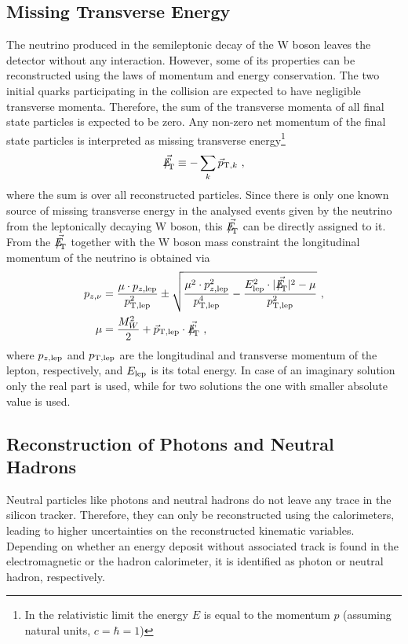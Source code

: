 \subsection{Missing Transverse Energy}
The neutrino produced in the semileptonic decay of the W boson leaves the detector without any interaction. However, some of its properties can be reconstructed using the laws of momentum and energy conservation. The two initial quarks participating in the collision are expected to have negligible transverse momenta. Therefore, the sum of the transverse momenta of all final state particles is expected to be zero. Any non-zero net momentum of the final state particles is interpreted as missing transverse energy\footnote{In the relativistic limit the energy $E$ is equal to the momentum $p$ (assuming natural units, $c=\hbar=1$)}\cite{MET}
\begin{equation}
\vec{{E\!\!\!\!/}_{\!\mathrm{T}}} \equiv -\sum_k \vec{p}_{{\rm T},k} ~,
\end{equation}
where the sum is over all reconstructed particles. Since there is only one known source of missing transverse energy in the analysed events given by the neutrino from the leptonically decaying W boson, this $\vec{{E\!\!\!\!/}_{\!\mathrm{T}}}$ can be directly assigned to it. From the $\vec{{E\!\!\!\!/}_{\!\mathrm{T}}}$ together with the W boson mass constraint the longitudinal momentum of the neutrino is obtained \cite{PAS} via
\begin{align}
p_{z,\nu} &= \frac{\mu \cdot p_{z,{\rm lep}}}{p_{\rm T,lep}^2} \pm \sqrt{\frac{\mu^2 \cdot p_{z,{\rm lep}}^2}{p_{\rm T,lep}^4} - \frac{E_{\rm lep}^2 \cdot |\vec{\MET}|^2 - \mu}{p_{\rm T,lep}^2}} ~, \\
\mu &= \frac{M_W^2}{2} + \vec{p}_{\rm T,lep}\cdot \vec{\MET} ~,
\end{align} 
where $p_{z,{\rm lep}}$ and $p_{\rm T,lep}$ are the longitudinal  and transverse momentum of the lepton, respectively, and $E_{\rm lep}$ is its total energy. In case of an imaginary solution only the real part is used, while for two solutions the one with smaller absolute value is used.
\subsection{Reconstruction of Photons and Neutral Hadrons}
Neutral particles like photons and neutral hadrons do not leave any trace in the silicon tracker. Therefore, they can only be reconstructed using the calorimeters, leading to higher uncertainties on the reconstructed kinematic variables. Depending on whether an energy deposit without associated track is found in the electromagnetic or the hadron calorimeter, it is identified as photon or neutral hadron, respectively. 
